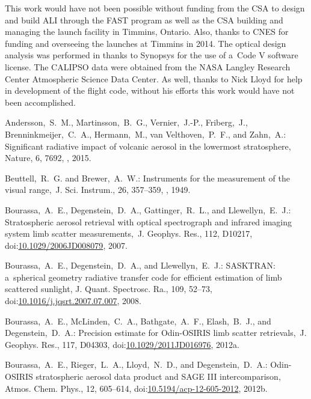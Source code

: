 \documentclass[amtd, online, hvmath]{copernicus}
\begin{document}
\begin{acknowledgements}
  This work would have not been possible without funding from the CSA
  to design and build ALI through the FAST program as well as the CSA
  building and managing the launch facility in Timmins, Ontario. Also,
  thanks to CNES for funding and overseeing the launches at Timmins in
  2014. The optical design analysis was performed in thanks to
  Synopsys for the use of a~Code V software license. The CALIPSO data
  were obtained from the NASA Langley Research Center Atmospheric
  Science Data Center. As well, thanks to Nick Lloyd for help in
  development of the flight code, without his efforts this work would
  have not been accomplished.
\end{acknowledgements}

\begin{thebibliography}{99}

Andersson,~S.~M., Martinsson,~B.~G., Vernier,~J.-P., Friberg,~J.,
Brenninkmeijer,~C.~A., Hermann,~M., van Velthoven,~P.~F., and Zahn,~A.:
Significant radiative impact of volcanic aerosol in the lowermost
stratosphere, Nature, 6, 7692, , 2015.


Beuttell,~R.~G. and Brewer,~A.~W.: Instruments for the measurement of the
visual range,~J. Sci. Instrum., 26, 357--359,
, 1949.


Bourassa,~A.~E., Degenstein,~D.~A., Gattinger,~R.~L., and Llewellyn,~E.~J.:
Stratospheric aerosol retrieval with optical spectrograph and infrared
imaging system limb scatter measurements,~J. Geophys. Res., 112, D10217,
doi:\href{http://dx.doi.org/10.1029/2006JD008079}{10.1029/2006JD008079},
2007.


Bourassa,~A.~E., Degenstein,~D.~A., and Llewellyn,~E.~J.: SASKTRAN:
a~spherical geometry radiative transfer code for efficient estimation of limb
scattered sunlight, J. Quant. Spectrosc. Ra., 109, 52--73,
doi:\href{http://dx.doi.org/10.1016/j.jqsrt.2007.07.007}{10.1016/j.jqsrt.2007.07.007},
2008.


Bourassa,~A.~E., McLinden,~C.~A., Bathgate,~A.~F., Elash,~B.~J., and
Degenstein,~D.~A.: Precision estimate for Odin-OSIRIS limb scatter
retrievals,~J. Geophys. Res., 117, D04303,
doi:\href{http://dx.doi.org/10.1029/2011JD016976}{10.1029/2011JD016976},
2012a.


Bourassa,~A.~E., Rieger,~L.~A., Lloyd,~N.~D., and Degenstein,~D.~A.:
Odin-OSIRIS stratospheric aerosol data product and SAGE III intercomparison,
Atmos. Chem. Phys., 12, 605--614,
doi:\href{http://dx.doi.org/10.5194/acp-12-605-2012}{10.5194/acp-12-605-2012},
2012b.



\end{thebibliography}
\end{document}
